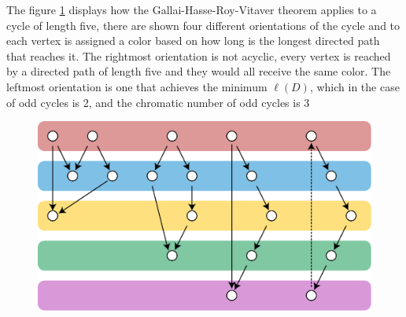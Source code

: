 \documentclass[a4paper,12pt,oneside]{book}
\begin{document}
 
The figure \ref{fig-vitaver} displays how the Gallai-Hasse-Roy-Vitaver theorem applies to a cycle of length five, there are shown four different orientations of the cycle and to each vertex is assigned a color based on how long is the longest directed path that reaches it. The rightmost orientation is not acyclic, every vertex is reached by a directed path of length five and they would all receive the same color. The leftmost orientation is one that achieves the minimum $\ell(D)$, which in the case of odd cycles is 2, and the chromatic number of odd cycles is 3
\vspace{2cm}
\begin{figure}[h]
\centering\includegraphics[scale=0.7]{vitaver.eps}
\caption{ }\label{fig-vitaver}
\end{figure}

\newpage
\end{document}
